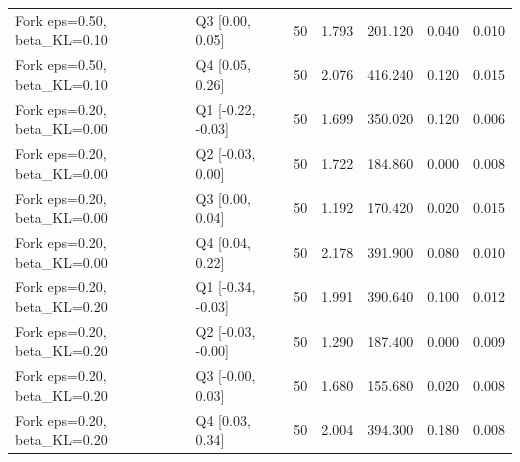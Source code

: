 \begin{table}[t]
\begin{tabular}{lllllll}
Fork eps=0.50, beta\_KL=0.10 & Q3 [0.00, 0.05] & 50 & 1.793 & 201.120 & 0.040 & 0.010 \\
Fork eps=0.50, beta\_KL=0.10 & Q4 [0.05, 0.26] & 50 & 2.076 & 416.240 & 0.120 & 0.015 \\
Fork eps=0.20, beta\_KL=0.00 & Q1 [-0.22, -0.03] & 50 & 1.699 & 350.020 & 0.120 & 0.006 \\
Fork eps=0.20, beta\_KL=0.00 & Q2 [-0.03, 0.00] & 50 & 1.722 & 184.860 & 0.000 & 0.008 \\
Fork eps=0.20, beta\_KL=0.00 & Q3 [0.00, 0.04] & 50 & 1.192 & 170.420 & 0.020 & 0.015 \\
Fork eps=0.20, beta\_KL=0.00 & Q4 [0.04, 0.22] & 50 & 2.178 & 391.900 & 0.080 & 0.010 \\
Fork eps=0.20, beta\_KL=0.20 & Q1 [-0.34, -0.03] & 50 & 1.991 & 390.640 & 0.100 & 0.012 \\
Fork eps=0.20, beta\_KL=0.20 & Q2 [-0.03, -0.00] & 50 & 1.290 & 187.400 & 0.000 & 0.009 \\
Fork eps=0.20, beta\_KL=0.20 & Q3 [-0.00, 0.03] & 50 & 1.680 & 155.680 & 0.020 & 0.008 \\
Fork eps=0.20, beta\_KL=0.20 & Q4 [0.03, 0.34] & 50 & 2.004 & 394.300 & 0.180 & 0.008 \\
\bottomrule
\end{tabular}
\end{table}
